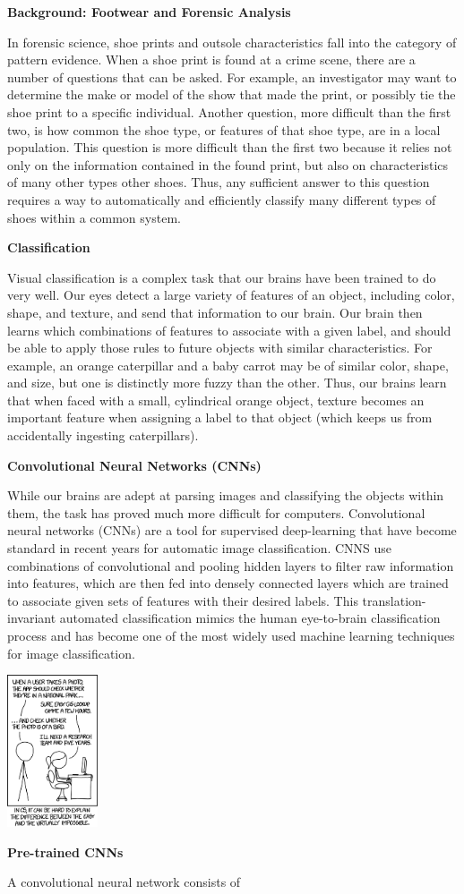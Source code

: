 \documentclass{article}\usepackage[]{graphicx}\usepackage[]{color}
\begin{document}
\textbf{Background: Footwear and Forensic Analysis}

In forensic science, shoe prints and outsole characteristics fall into the category of pattern evidence. When a shoe print is found at a crime scene, there are a number of questions that can be asked. For example, an investigator may want to determine the make or model of the show that made the print, or possibly tie the shoe print to a specific individual. Another question, more difficult than the first two, is how common the shoe type, or features of that shoe type, are in a local population. This question is more difficult than the first two because it relies not only on the information contained in the found print, but also on characteristics of many other types other shoes. Thus, any sufficient answer to this question requires a way to automatically and efficiently classify many different types of shoes within a common system.


\textbf{Classification}

Visual classification is a complex task that our brains have been trained to do very well. Our eyes detect a large variety of features of an object, including color, shape, and texture, and send that information to our brain. Our brain then learns which combinations of features to associate with a given label, and should be able to apply those rules to future objects with similar characteristics. For example, an orange caterpillar and a baby carrot may be of similar color, shape, and size, but one is distinctly more fuzzy than the other. Thus, our brains learn that when faced with a small, cylindrical orange object, texture becomes an important feature when assigning a label to that object (which keeps us from accidentally ingesting caterpillars). 

\textbf{Convolutional Neural Networks (CNNs)}

While our brains are adept at parsing images and classifying the objects within them, the task has proved much more difficult for computers. Convolutional neural networks (CNNs) are a tool for supervised deep-learning that have become standard in recent years for automatic image classification. CNNS use combinations of convolutional and pooling hidden layers to filter raw information into features, which are then fed into densely connected layers which are trained to associate given sets of features with their desired labels. This translation-invariant automated classification mimics the human eye-to-brain classification process and has become one of the most widely used machine learning techniques for image classification.


\centerline{\includegraphics[height=4.5cm]{bird.png}}

\clearpage

\textbf{Pre-trained CNNs}

A convolutional neural network consists of 
\end{document}
